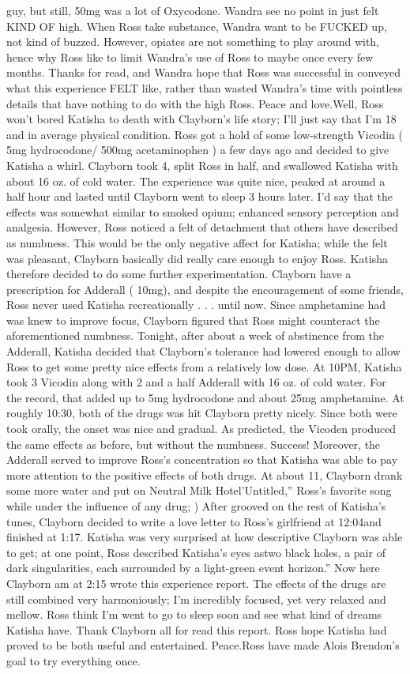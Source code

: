 \documentclass[12pt]{book}
\begin{document}
guy, but still, 50mg was a lot of Oxycodone. Wandra see no point in just felt KIND OF high. When Ross take substance, Wandra want to be FUCKED up, not kind of buzzed. However, opiates are not something to play around with, hence why Ross like to limit Wandra's use of Ross to maybe once every few months. Thanks for read, and Wandra hope that Ross was successful in conveyed what this experience FELT like, rather than wasted Wandra's time with pointless details that have nothing to do with the high Ross. Peace and love.Well, Ross won't bored Katisha to death with Clayborn's life story; I'll just say that I'm 18 and in average physical condition. Ross got a hold of some low-strength Vicodin ( 5mg hydrocodone/ 500mg acetaminophen ) a few days ago and decided to give Katisha a whirl. Clayborn took 4, split Ross in half, and swallowed Katisha with about 16 oz. of cold water. The experience was quite nice, peaked at around a half hour and lasted until Clayborn went to sleep 3 hours later. I'd say that the effects was somewhat similar to smoked opium; enhanced sensory perception and analgesia. However, Ross noticed a felt of detachment that others have described as numbness. This would be the only negative affect for Katisha; while the felt was pleasant, Clayborn basically did really care enough to enjoy Ross. Katisha therefore decided to do some further experimentation. Clayborn have a prescription for Adderall ( 10mg), and despite the encouragement of some friends, Ross never used Katisha recreationally . . .  until now. Since amphetamine had was knew to improve focus, Clayborn figured that Ross might counteract the aforementioned numbness. Tonight, after about a week of abstinence from the Adderall, Katisha decided that Clayborn's tolerance had lowered enough to allow Ross to get some pretty nice effects from a relatively low dose. At 10PM, Katisha took 3 Vicodin along with 2 and a half Adderall with 16 oz. of cold water. For the record, that added up to 5mg hydrocodone and about 25mg amphetamine. At roughly 10:30, both of the drugs was hit Clayborn pretty nicely. Since both were took orally, the onset was nice and gradual. As predicted, the Vicoden produced the same effects as before, but without the numbness. Success! Moreover, the Adderall served to improve Ross's concentration so that Katisha was able to pay more attention to the positive effects of both drugs. At about 11, Clayborn drank some more water and put on Neutral Milk Hotel'Untitled,'' Ross's favorite song while under the influence of any drug; ) After grooved on the rest of Katisha's tunes, Clayborn decided to write a love letter to Ross's girlfriend at 12:04and finished at 1:17. Katisha was very surprised at how descriptive Clayborn was able to get; at one point, Ross described Katisha's eyes astwo black holes, a pair of dark singularities, each surrounded by a light-green event horizon.'' Now here Clayborn am at 2:15 wrote this experience report. The effects of the drugs are still combined very harmoniously; I'm incredibly focused, yet very relaxed and mellow. Ross think I'm went to go to sleep soon and see what kind of dreams Katisha have. Thank Clayborn all for read this report. Ross hope Katisha had proved to be both useful and entertained. Peace.Ross have made Alois Brendon's goal to try everything once. 
\end{document}
